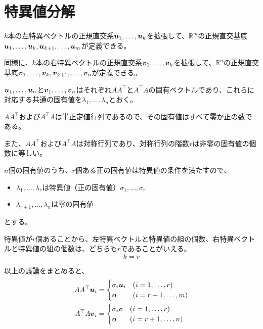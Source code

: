 \documentclass[../../../topic_linear-algebra]{subfiles}
\begin{document}
\sectionline
\section{特異値分解}

$k$本の左特異ベクトルの正規直交系$\vb*{u}_1,\ldots,\vb*{u}_k$を拡張して、$\mathbb{R}^m$の正規直交基底$\vb*{u}_1,\ldots,\vb*{u}_k,\vb*{u}_{k+1},\ldots,\vb*{u}_m$が定義できる。

同様に、$k$本の右特異ベクトルの正規直交系$\vb*{v}_1,\ldots,\vb*{v}_k$を拡張して、$\mathbb{R}^n$の正規直交基底$\vb*{v}_1,\ldots,\vb*{v}_k,\vb*{v}_{k+1},\ldots,\vb*{v}_n$が定義できる。

\br

$\vb*{u}_1,\ldots,\vb*{u}_n$と$\vb*{v}_1,\ldots,\vb*{v}_n$はそれぞれ$AA^\top$と$A^\top A$の固有ベクトルであり、これらに対応する共通の固有値を$\lambda_1,\ldots,\lambda_n$とおく。

\br

$AA^\top$および$A^\top A$は半正定値行列であるので、その固有値はすべて零か正の数である。

また、$AA^\top$および$A^\top A$は対称行列であり、対称行列の階数$r$は非零の固有値の個数に等しい。

$n$個の固有値のうち、$r$個ある正の固有値は特異値の条件を満たすので、
\begin{itemize}
  \item $\lambda_1,\ldots,\lambda_r$は特異値（正の固有値）$\sigma_1,\ldots,\sigma_r$
  \item $\lambda_{r+1},\ldots,\lambda_{n}$は零の固有値
\end{itemize}
とする。

\br

特異値が$r$個あることから、左特異ベクトルと特異値の組の個数、右特異ベクトルと特異値の組の個数は、どちらも$r$であることがいえる。
\begin{equation*}
  k = r
\end{equation*}

以上の議論をまとめると、
\begin{align*}
  AA^\top \vb*{u}_i  & = \begin{cases}
                           \sigma_i \vb*{u}_i & (i = 1,\ldots,r)   \\
                           \vb*{o}            & (i = r+1,\ldots,m)
                         \end{cases} \\
  A^\top A \vb*{v}_i & = \begin{cases}
                           \sigma_i \vb*{v} & (i = 1,\ldots, r)   \\
                           \vb*{o}          & (i = r+1,\ldots, n)
                         \end{cases}
\end{align*}
\end{document}

